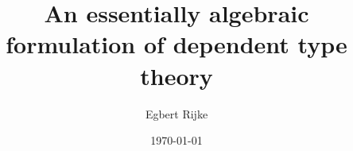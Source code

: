 \documentclass{article}
\title{An essentially algebraic formulation of dependent type theory}
\author{Egbert Rijke}
\date{\today}
\begin{document}
\maketitle


%


\begin{comment}
In this part we develop type theory from the ground up. We start with a type
theory without any of the basic constructors. This is the theory of contexts
families and terms which has the basic operations of extension, weakening,
substitution and identity terms. Type theory before type constructors has not
been studied very much. Dependent product types or even universes tend to make
an early appearance in just about any presentation of type theory.
A noteable exception is the theory of categories with families of Dybjer
in \cite{Dybjer1996}, which has been elaborated on further by Dybjer and
Clairambault in \cite{DybjerClairambault2011} and in unpublished work by
Awodey \cite{Awodey2013} on natural models of type theory,
which makes the connection between categories with families and representable
transformations of presheaves. In the way type theory is presented by the
Univalent Foundations Project in \cite{TheBook}, which seems to have won the race of introducing universes
as early as possible hands down, it seems entirely unfeasible to study type
theory without type constructors. Also, the 
proof-assistant \Coq\ {\color{red}(and \Agda too?)} has universes and dependent product and pair types 
built-in, making it impossible to study type theory without type constructors in 
that environment.

Nevertheless, type theory without type constructors has received some attention
contributors to the Univalent Foundations Program recently. We name two
further investigations on this topic, other than the mentioned work by Awodey.
In \cite{Garner2014}, Garner describes the combinatorial structure
of the type operations of the weakening, substitution and projection monads
(their projections are our identity terms) and suggests lots of further research
that can be done on type theory without constructors. Also, Joyal has presented
his theory of tribes, which is a categorical explanation of type theory
without type constructors.

After we have described the E-system, which is the flavor of type theory without
type constructors presented in \autoref{tt}, we will demonstrate in \autoref{ttderived}
that the theory gives rise to a rich categorical structure. The notions and
properties we derive here will be essential for the further work on internal
models for E-systems, presented in \autoref{part:models}.
\end{comment}
\end{document}
